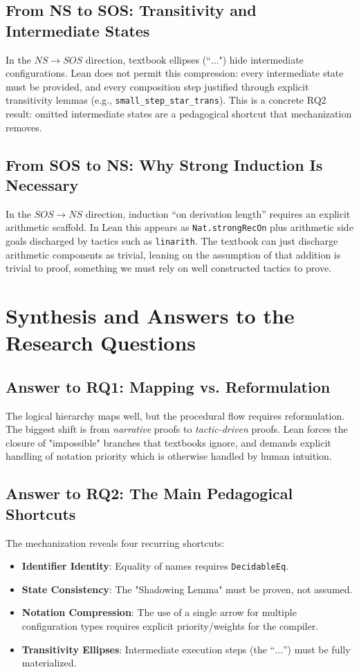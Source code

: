 \subsection*{From NS to SOS: Transitivity and Intermediate States}
In the $NS \to SOS$ direction, textbook ellipses (``$\dots$") hide intermediate
configurations. Lean does not permit this compression: every intermediate state
must be provided, and every composition step justified through explicit
transitivity lemmas (e.g., \texttt{small\_step\_star\_trans}). This is a concrete
RQ2 result: omitted intermediate states are a pedagogical shortcut that
mechanization removes.

\subsection*{From SOS to NS: Why Strong Induction Is Necessary}
In the $SOS \to NS$ direction, induction ``on derivation length'' requires an explicit
arithmetic scaffold. In Lean this appears as \texttt{Nat.strongRecOn} plus
arithmetic side goals discharged by tactics such as \texttt{linarith}.
The textbook can just discharge arithmetic components as trivial, leaning on the assumption
of that addition is trivial to proof, something we must rely on well constructed tactics to prove.

%
%
%
\section{Synthesis and Answers to the Research Questions}

\subsection*{Answer to RQ1: Mapping vs. Reformulation}
The logical hierarchy maps well, but the procedural flow requires reformulation.
The biggest shift is from \textit{narrative} proofs to \textit{tactic-driven} proofs.
Lean forces the closure of "impossible" branches that textbooks ignore, and demands
explicit handling of notation priority which is otherwise handled by human intuition.

\subsection*{Answer to RQ2: The Main Pedagogical Shortcuts}
The mechanization reveals four recurring shortcuts:
\begin{itemize}
    \item \textbf{Identifier Identity}: Equality of names requires \texttt{DecidableEq}.

    \item \textbf{State Consistency}: The "Shadowing Lemma" must be proven, not assumed.

    \item \textbf{Notation Compression}: The use of a single arrow for multiple
    configuration types requires explicit priority/weights for the compiler.

    \item \textbf{Transitivity Ellipses}: Intermediate execution steps (the ``$\dots$'')
    must be fully materialized.
\end{itemize}

